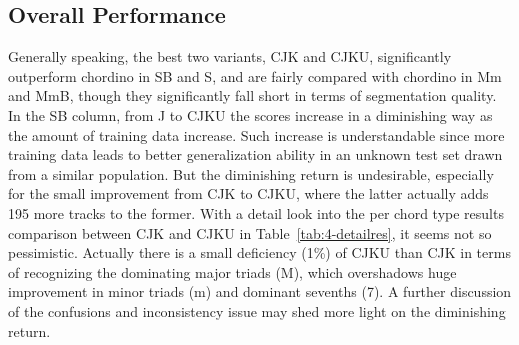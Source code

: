 \subsection{Overall Performance}
Generally speaking, the best two variants, CJK and CJKU, significantly outperform chordino in SB and S, and are fairly compared with chordino in Mm and MmB, though they significantly fall short in terms of segmentation quality. In the SB column, from J to CJKU the scores increase in a diminishing way as the amount of training data increase. Such increase is understandable since more training data leads to better generalization ability in an unknown test set drawn from a similar population. But the diminishing return is undesirable, especially for the small improvement from CJK to CJKU, where the latter actually adds 195 more tracks to the former. With a detail look into the per chord type results comparison between CJK and CJKU in Table~\ref{tab:4-detailres}, it seems not so pessimistic. Actually there is a small deficiency (1\%) of CJKU than CJK in terms of recognizing the dominating major triads (M), which overshadows huge improvement in minor triads (m) and dominant sevenths (7). A further discussion of the confusions and inconsistency issue may shed more light on the diminishing return.
